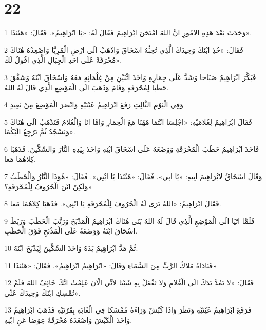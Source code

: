 \chapter{22}

\par 1 وَحَدَثَ بَعْدَ هَذِهِ الامُورِ انَّ اللهَ امْتَحَنَ ابْرَاهِيمَ فَقَالَ لَهُ: «يَا ابْرَاهِيمُ». فَقَالَ: «هَئَنَذَا».
\par 2 فَقَالَ: «خُذِ ابْنَكَ وَحِيدَكَ الَّذِي تُحِبُّهُ اسْحَاقَ وَاذْهَبْ الَى ارْضِ الْمُرِيَّا وَاصْعِدْهُ هُنَاكَ مُحْرَقَةً عَلَى احَدِ الْجِبَالِ الَّذِي اقُولُ لَكَ».
\par 3 فَبَكَّرَ ابْرَاهِيمُ صَبَاحا وَشَدَّ عَلَى حِمَارِهِ وَاخَذَ اثْنَيْنِ مِنْ غِلْمَانِهِ مَعَهُ وَاسْحَاقَ ابْنَهُ وَشَقَّقَ حَطَبا لِمُحْرَقَةٍ وَقَامَ وَذَهَبَ الَى الْمَوْضِعِ الَّذِي قَالَ لَهُ اللهُ.
\par 4 وَفِي الْيَوْمِ الثَّالِثِ رَفَعَ ابْرَاهِيمُ عَيْنَيْهِ وَابْصَرَ الْمَوْضِعَ مِنْ بَعِيدٍ
\par 5 فَقَالَ ابْرَاهِيمُ لِغُلامَيْهِ: «اجْلِسَا انْتُمَا هَهُنَا مَعَ الْحِمَارِ وَامَّا انَا وَالْغُلامُ فَنَذْهَبُ الَى هُنَاكَ وَنَسْجُدُ ثُمَّ نَرْجِعُ الَيْكُمَا».
\par 6 فَاخَذَ ابْرَاهِيمُ حَطَبَ الْمُحْرَقَةِ وَوَضَعَهُ عَلَى اسْحَاقَ ابْنِهِ وَاخَذَ بِيَدِهِ النَّارَ وَالسِّكِّينَ. فَذَهَبَا كِلاهُمَا مَعا.
\par 7 وَقَالَ اسْحَاقُ لابْرَاهِيمَ ابِيهِ: «يَا ابِي». فَقَالَ: «هَئَنَذَا يَا ابْنِي». فَقَالَ: «هُوَذَا النَّارُ وَالْحَطَبُ وَلَكِنْ ايْنَ الْخَرُوفُ لِلْمُحْرَقَةِ؟»
\par 8 فَقَالَ ابْرَاهِيمُ: «اللهُ يَرَى لَهُ الْخَرُوفَ لِلْمُحْرَقَةِ يَا ابْنِي». فَذَهَبَا كِلاهُمَا مَعا.
\par 9 فَلَمَّا اتَيَا الَى الْمَوْضِعِ الَّذِي قَالَ لَهُ اللهُ بَنَى هُنَاكَ ابْرَاهِيمُ الْمَذْبَحَ وَرَتَّبَ الْحَطَبَ وَرَبَطَ اسْحَاقَ ابْنَهُ وَوَضَعَهُ عَلَى الْمَذْبَحِ فَوْقَ الْحَطَبِ.
\par 10 ثُمَّ مَدَّ ابْرَاهِيمُ يَدَهُ وَاخَذَ السِّكِّينَ لِيَذْبَحَ ابْنَهُ.
\par 11 فَنَادَاهُ مَلاكُ الرَّبِّ مِنَ السَّمَاءِ وَقَالَ: «ابْرَاهِيمُ ابْرَاهِيمُ». فَقَالَ: «هَئَنَذَا»
\par 12 فَقَالَ: «لا تَمُدَّ يَدَكَ الَى الْغُلامِ وَلا تَفْعَلْ بِهِ شَيْئا لانِّي الْانَ عَلِمْتُ انَّكَ خَائِفٌ اللهَ فَلَمْ تُمْسِكِ ابْنَكَ وَحِيدَكَ عَنِّي».
\par 13 فَرَفَعَ ابْرَاهِيمُ عَيْنَيْهِ وَنَظَرَ وَاذَا كَبْشٌ وَرَاءَهُ مُمْسَكا فِي الْغَابَةِ بِقَرْنَيْهِ فَذَهَبَ ابْرَاهِيمُ وَاخَذَ الْكَبْشَ وَاصْعَدَهُ مُحْرَقَةً عِوَضا عَنِ ابْنِهِ.
